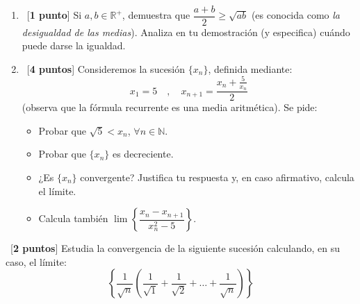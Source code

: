 \documentclass[12pt]{article}
\begin{document}
    \begin{ejercicio}\ 
        \begin{enumerate}[label=\alph*)]
            \item\ [\textbf{1 punto}] Si $a,b\in \mathbb{R}^+$, demuestra que $\dfrac{a+b}{2}\geq \sqrt{ab}$ (es conocida como \textit{la desigualdad de las medias}). Analiza en tu demostración (y especifica) cuándo puede darse la igualdad.
            \item\ [\textbf{4 puntos}] Consideremos la sucesión $\{x_n\}$, definida mediante:
                \begin{equation*}
                    x_1 = 5\quad , \quad x_{n+1} = \dfrac{x_n+\frac{5}{x_n}}{2}
                \end{equation*}
                (observa que la fórmula recurrente es una media aritmética).\newline
                Se pide:
                \begin{itemize}
                    \item Probar que $\sqrt{5} < x_n$, $\forall n\in \mathbb{N}$.
                    \item Probar que $\{x_n\}$ es decreciente.
                    \item ¿Es $\{x_n\}$ convergente? Justifica tu respuesta y, en caso afirmativo, calcula el límite.
                    \item Calcula también $\lim \left\{\dfrac{x_n-x_{n+1}}{x_n^2 - 5}\right\}$.
                \end{itemize}
        \end{enumerate}
    \end{ejercicio}

    \begin{ejercicio}\ 
        [\textbf{2 puntos}] Estudia la convergencia de la siguiente sucesión calculando, en su caso, el límite:
        \begin{equation*}
            \left\{\dfrac{1}{\sqrt{n}}\left(\dfrac{1}{\sqrt{1}} + \dfrac{1}{\sqrt{2}} + \ldots + \dfrac{1}{\sqrt{n}}\right)\right\}
        \end{equation*}
    \end{ejercicio}
\end{document}
